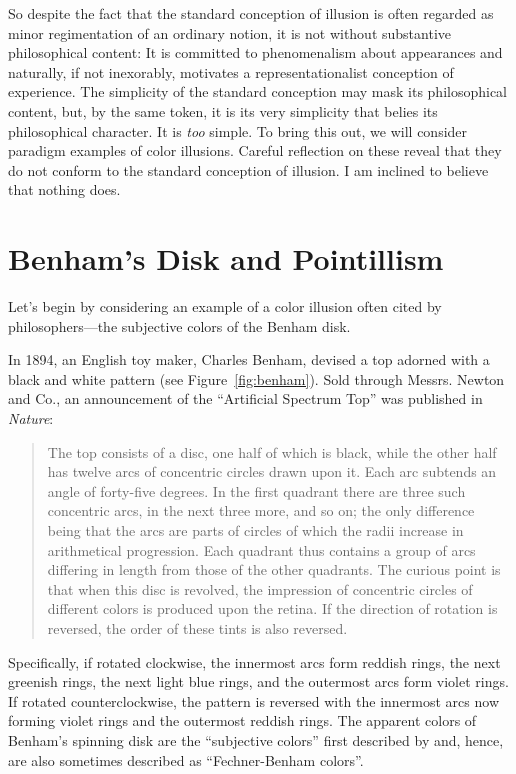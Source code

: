 \documentclass[12pt]{article}
\begin{document}
So despite the fact that the standard conception of illusion is often regarded as minor regimentation of an ordinary notion, it is not without substantive philosophical content: It is committed to phenomenalism about appearances and naturally, if not inexorably, motivates a representationalist conception of experience. The simplicity of the standard conception may mask its philosophical content, but, by the same token, it is its very simplicity that belies its philosophical character. It is \emph{too} simple. To bring this out, we will consider paradigm examples of color illusions. Careful reflection on these reveal that they do not conform to the standard conception of illusion. I am inclined to believe that nothing does.


\section{Benham's Disk and Pointillism} %
\label{sec:benham_s_disk}

Let's begin by considering an example of a color illusion often cited by philosophers---the subjective colors of the Benham disk.

In 1894, an English toy maker, Charles Benham, devised a top adorned with a black and white pattern (see Figure~\ref{fig:benham}). Sold through Messrs. Newton and Co., an announcement of the ``Artificial Spectrum Top'' was published in \emph{Nature}:
	\begin{quote}
		The top consists of a disc, one half of which is black, while the other half has twelve arcs of concentric circles drawn upon it. Each arc subtends an angle of forty-five degrees. In the first quadrant there are three such concentric arcs, in the next three more, and so on; the only difference being that the arcs are parts of circles of which the radii increase in arithmetical progression. Each quadrant thus contains a group of arcs differing in length from those of the other quadrants. The curious point is that when this disc is revolved, the impression of concentric circles of different colors is produced upon the retina. If the direction of rotation is reversed, the order of these tints is also reversed. \citep{Benham:1894kx}
	\end{quote}
Specifically, if rotated clockwise, the innermost arcs form reddish rings, the next greenish rings, the next light blue rings, and the outermost arcs form violet rings. If rotated counterclockwise, the pattern is reversed with the innermost arcs now forming violet rings and the outermost reddish rings. The apparent colors of Benham's spinning disk are the ``subjective colors'' first described by \citep{Fechner:1838vn} and, hence, are also sometimes described as ``Fechner-Benham colors''. 
\end{document}
